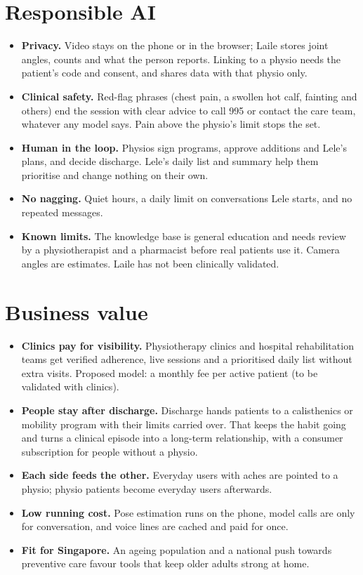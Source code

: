 \documentclass[11pt,a4paper]{article}
\begin{document}
\section{Responsible AI}
\begin{itemize}
  \item \textbf{Privacy.} Video stays on the phone or in the browser; Laile stores joint angles, counts and what the person reports. Linking to a physio needs the patient's code and consent, and shares data with that physio only.
  \item \textbf{Clinical safety.} Red-flag phrases (chest pain, a swollen hot calf, fainting and others) end the session with clear advice to call 995 or contact the care team, whatever any model says. Pain above the physio's limit stops the set.
  \item \textbf{Human in the loop.} Physios sign programs, approve additions and Lele's plans, and decide discharge. Lele's daily list and summary help them prioritise and change nothing on their own.
  \item \textbf{No nagging.} Quiet hours, a daily limit on conversations Lele starts, and no repeated messages.
  \item \textbf{Known limits.} The knowledge base is general education and needs review by a physiotherapist and a pharmacist before real patients use it. Camera angles are estimates. Laile has not been clinically validated.
\end{itemize}

\section{Business value}
\begin{itemize}
  \item \textbf{Clinics pay for visibility.} Physiotherapy clinics and hospital rehabilitation teams get verified adherence, live sessions and a prioritised daily list without extra visits. Proposed model: a monthly fee per active patient (to be validated with clinics).
  \item \textbf{People stay after discharge.} Discharge hands patients to a calisthenics or mobility program with their limits carried over. That keeps the habit going and turns a clinical episode into a long-term relationship, with a consumer subscription for people without a physio.
  \item \textbf{Each side feeds the other.} Everyday users with aches are pointed to a physio; physio patients become everyday users afterwards.
  \item \textbf{Low running cost.} Pose estimation runs on the phone, model calls are only for conversation, and voice lines are cached and paid for once.
  \item \textbf{Fit for Singapore.} An ageing population and a national push towards preventive care favour tools that keep older adults strong at home.
\end{itemize}
\end{document}
